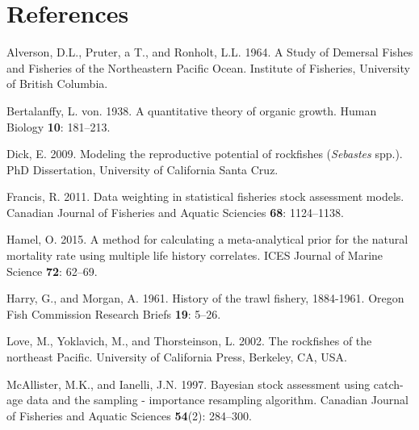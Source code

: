 \documentclass[12pt,]{article}
\begin{document}
\FloatBarrier

\FloatBarrier

\FloatBarrier

\FloatBarrier

\FloatBarrier

\FloatBarrier

\FloatBarrier

\newpage

\section*{References}\label{references}

\renewcommand{\thepage}{}

\hypertarget{refs}{}
\hypertarget{ref-Alverson1964}{}
Alverson, D.L., Pruter, a T., and Ronholt, L.L. 1964. A Study of
Demersal Fishes and Fisheries of the Northeastern Pacific Ocean.
Institute of Fisheries, University of British Columbia.

\hypertarget{ref-vonB1938}{}
Bertalanffy, L. von. 1938. A quantitative theory of organic growth.
Human Biology \textbf{10}: 181--213.

\hypertarget{ref-Dick2009}{}
Dick, E. 2009. Modeling the reproductive potential of rockfishes
(\emph{Sebastes} spp.). PhD Dissertation, University of California Santa
Cruz.

\hypertarget{ref-Francis2011}{}
Francis, R. 2011. Data weighting in statistical fisheries stock
assessment models. Canadian Journal of Fisheries and Aquatic Sciencies
\textbf{68}: 1124--1138.

\hypertarget{ref-Hamel2015}{}
Hamel, O. 2015. A method for calculating a meta-analytical prior for the
natural mortality rate using multiple life history correlates. ICES
Journal of Marine Science \textbf{72}: 62--69.

\hypertarget{ref-Harry1961}{}
Harry, G., and Morgan, A. 1961. History of the trawl fishery, 1884-1961.
Oregon Fish Commission Research Briefs \textbf{19}: 5--26.

\hypertarget{ref-Love2002}{}
Love, M., Yoklavich, M., and Thorsteinson, L. 2002. The rockfishes of
the northeast Pacific. University of California Press, Berkeley, CA,
USA.

\hypertarget{ref-McAllister1997}{}
McAllister, M.K., and Ianelli, J.N. 1997. Bayesian stock assessment
using catch-age data and the sampling - importance resampling algorithm.
Canadian Journal of Fisheries and Aquatic Sciences \textbf{54}(2):
284--300.
\end{document}
